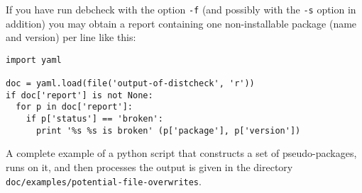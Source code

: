 \begin{example}
  If you have run debcheck with the option \texttt{-f} (and possibly
  with the \texttt{-s} option in addition) you may obtain a report
  containing one non-installable package (name and version) per line
  like this:
  
\begin{verbatim}
import yaml

doc = yaml.load(file('output-of-distcheck', 'r'))
if doc['report'] is not None:
  for p in doc['report']:
    if p['status'] == 'broken':
      print '%s %s is broken' (p['package'], p['version'])
\end{verbatim}
\end{example}

A complete example of a python script that constructs a set of
pseudo-packages, runs \debcheck{} on it, and then processes the output
is given in the directory
\texttt{doc/examples/potential-file-overwrites}.


